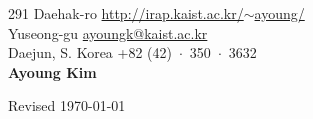 \documentclass{cv} %
\begin{document}
291 Daehak-ro \hfill \href{http://irap.kaist.ac.kr/$\sim$ayoung/}{http://irap.kaist.ac.kr/$\sim$ayoung/}\\
Yuseong-gu \hfill \href{mailto:ayoungk@kaist.ac.kr}{ayoungk@kaist.ac.kr}\\
Daejun, S. Korea \hfill +82 (42)~$\cdot$~350~$\cdot$~3632\\

\hfil{\namesize\bf Ayoung Kim}\hfil

%





%
%



%
%



\vspace{0.5in}
\hfill Revised \today
\end{document}
